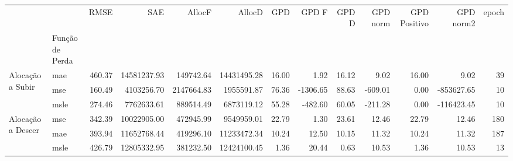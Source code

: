 \begin{tabular}{llrrrrrrrrrrr}
\toprule
 &  & RMSE & SAE & AllocF & AllocD & GPD & GPD F & GPD D & GPD norm & GPD Positivo & GPD norm2 & epoch \\
 & Função de Perda &  &  &  &  &  &  &  &  &  &  &  \\
\midrule
\multirow[t]{3}{*}{Alocação a Subir} & mae & 460.37 & 14581237.93 & 149742.64 & 14431495.28 & 16.00 & 1.92 & 16.12 & 9.02 & 16.00 & 9.02 & 39 \\
 & mse & 160.49 & 4103256.70 & 2147664.83 & 1955591.87 & 76.36 & -1306.65 & 88.63 & -609.01 & 0.00 & -853627.65 & 10 \\
 & msle & 274.46 & 7762633.61 & 889514.49 & 6873119.12 & 55.28 & -482.60 & 60.05 & -211.28 & 0.00 & -116423.45 & 10 \\
\cline{1-13}
\multirow[t]{3}{*}{Alocação a Descer} & mse & 342.39 & 10022905.00 & 472945.99 & 9549959.01 & 22.79 & 1.30 & 23.61 & 12.46 & 22.79 & 12.46 & 180 \\
 & mae & 393.94 & 11652768.44 & 419296.10 & 11233472.34 & 10.24 & 12.50 & 10.15 & 11.32 & 10.24 & 11.32 & 187 \\
 & msle & 426.79 & 12805332.95 & 381232.50 & 12424100.45 & 1.36 & 20.44 & 0.63 & 10.53 & 1.36 & 10.53 & 13 \\
\cline{1-13}
\bottomrule
\end{tabular}
